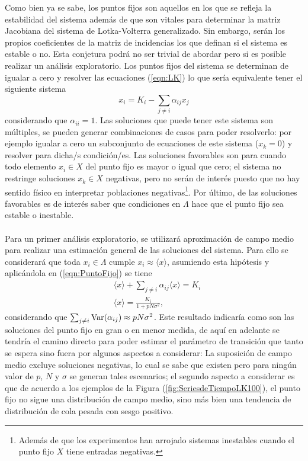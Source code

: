 Como bien ya se sabe, los puntos fijos son aquellos en los que se refleja la estabilidad del sistema además de que son vitales para determinar la matriz Jacobiana del sistema de Lotka-Volterra generalizado. Sin embargo, serán los propios coeficientes de la matriz de incidencias los que definan si el sistema es estable o no. Esta conjetura podrá no ser trivial de abordar pero si es posible realizar un análisis exploratorio. Los puntos fijos del sistema se determinan de igualar a cero y resolver las ecuaciones (\ref{eqn:LK}) lo que sería equivalente tener el siguiente sistema
\begin{equation}\label{eqn:PuntoFijo}
	x_i=K_i-\sum_{j\neq i}\alpha_{ij}x_j
\end{equation}
considerando que $\alpha_{ii}=1$. Las soluciones que puede tener este sistema son múltiples, se pueden generar combinaciones de casos para poder resolverlo: por ejemplo igualar a cero un subconjunto de ecuaciones de este sistema ($x_{k}=0$) y resolver para dicha/s condición/es. Las soluciones favorables son para cuando todo elemento $x_i\in X$ del punto fijo es mayor o igual que cero; el sistema no restringe soluciones $x_k\in X$ negativas, pero no serán de interés puesto que no hay sentido físico en interpretar poblaciones negativas\footnote{Además de que los experimentos han arrojado sistemas inestables cuando el punto fijo $X$ tiene entradas negativas.}. Por último, de las soluciones favorables es de interés saber que condiciones en $\Lambda$ hace que el punto fijo sea estable o inestable.\\
\\
Para un primer análisis exploratorio, se utilizará aproximación de campo medio para realizar una estimación general de las soluciones del sistema. Para ello se considerará que toda $x_i\in\Lambda$ cumple $x_i\approx\langle x\rangle$, asumiendo esta hipótesis y aplicándola en (\ref{eqn:PuntoFijo}) se tiene
\begin{equation}
	\begin{split}
		&\langle x\rangle+\sum_{j\neq i}\alpha_{ij}\langle x\rangle=K_i\\
		&\langle x\rangle=\frac{K_i}{1+pN\sigma^2},\qquad 
	\end{split}
\end{equation}
considerando que $\sum_{j\neq i}\mathrm{Var}(\alpha_{ij})\approx pN\sigma^2$. Este resultado indicaría como son las soluciones del punto fijo en gran o en menor medida, de aquí en adelante se tendría el camino directo para poder estimar el parámetro de transición que tanto se espera sino fuera por algunos aspectos a considerar: La suposición de campo medio excluye soluciones negativas, lo cual se sabe que existen pero para ningún valor de $p$, $N$ y $\sigma$ se generan tales escenarios; el segundo aspecto a considerar es que de acuerdo a los ejemplos de la Figura (\ref{fig:SeriesdeTiempoLK100}), el punto fijo no sigue una distribución de campo medio, sino más bien una tendencia de distribución de cola pesada con sesgo positivo. \\
